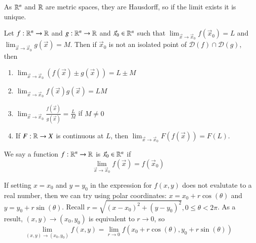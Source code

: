 \begin{appendices}
    
    \begin{rmk}
        As $\mathbb R^n$ and $\mathbb R$ are metric spaces, they are Hausdorff, so if the limit exists it is unique.
    \end{rmk}


    \begin{rmk}
        Let $f:\mathbb R^n\rightarrow \mathbb R$ and $g:\mathbb R^n\rightarrow \mathbb R$ and $\vec{x}_0\in \mathbb R^n$ such that $\lim_{\vec{x}\rightarrow \vec{x}_0}f(\vec{x}_0) = L$ and $\lim_{\vec{x}\rightarrow \vec{x}_0}g(\vec{x}) = M$. Then if $\vec{x}_0$ is not an isolated point of $\mathscr{D}(f) \cap \mathscr{D}(g)$, then \begin{enumerate}
            \item $\lim_{\vec{x}\rightarrow \vec{x}_0}(f(\vec{x}) \pm g(\vec{x})) = L \pm M$
            \item $\lim_{\vec{x}\rightarrow \vec{x}_0}f(\vec{x})g(\vec{x}) = LM$
            \item $\lim_{\vec{x}\rightarrow \vec{x}_0}\frac{f(\vec{x})}{g(\vec{x})} = \frac{L}{M}$ if $M \neq 0$
            \item If $F:\mathbb R\rightarrow X$ is continuous at $L$, then $\lim_{\vec{x}\rightarrow \vec{x}_0}F(f(\vec{x})) = F(L)$.
        \end{enumerate}
    \end{rmk}

    \begin{defn}
        We say a function $f:\mathbb R^n\rightarrow \mathbb R$ is  $\vec{x}_0\in \mathbb R^n$ if \begin{equation}
            \lim_{\vec{x}\rightarrow \vec{x}_0} f(\vec{x}) = f(\vec{x}_0)
        \end{equation}
    \end{defn}


    

    \begin{rmk}
        If setting $x = x_0$ and $y = y_0$ in the expression for $f(x,y)$ does not evalutate to a real number, then we can try using polar coordinates: $x = x_0 + r\cos(\theta)$ and $y = y_0 + r\sin(\theta)$. Recall $r = \sqrt{(x-x_0)^2 + (y-y_0)^2}, 0 \leq \theta < 2\pi$. As a result, $(x,y) \rightarrow (x_0,y_0)$ is equivalent to $r\rightarrow 0$, so \begin{equation}
            \lim\limits_{(x,y) \rightarrow (x_0,y_0)}f(x,y) = \lim\limits_{r\rightarrow 0}f(x_0+r\cos(\theta), y_0+r\sin(\theta))
        \end{equation}
    \end{rmk}


\end{appendices}
